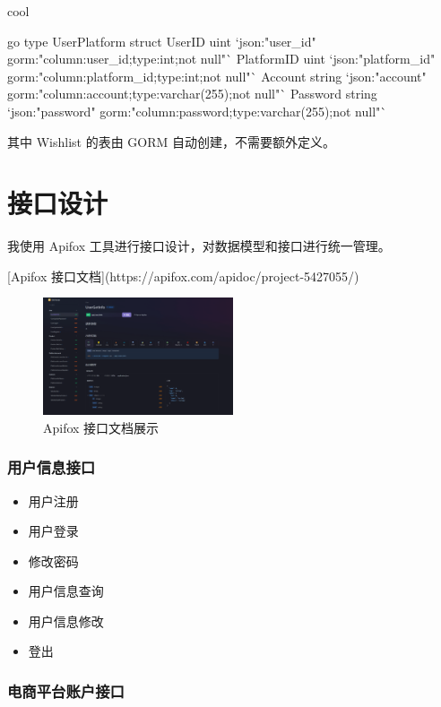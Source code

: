 \begin{codebox}{}{cool}
\begin{amzcode}{go}
type UserPlatform struct {
    UserID     uint   `json:"user_id" gorm:"column:user_id;type:int;not null"`
    PlatformID uint   `json:"platform_id" gorm:"column:platform_id;type:int;not null"`
    Account    string `json:"account" gorm:"column:account;type:varchar(255);not null"`
    Password   string `json:"password" gorm:"column:password;type:varchar(255);not null"`
}
\end{amzcode}
\end{codebox}

其中 Wishlist 的表由 GORM 自动创建，不需要额外定义。

\section{接口设计}

我使用 Apifox 工具进行接口设计，对数据模型和接口进行统一管理。

[Apifox 接口文档](https://apifox.com/apidoc/project-5427055/)

\begin{figure}[H]
\centering
\includegraphics[width=0.5\textwidth]{assets/design/apifox.png}
\caption{Apifox 接口文档展示}
\end{figure}

\subsubsection{用户信息接口}

\begin{itemize}
  \item 用户注册
  \item 用户登录
  \item 修改密码
  \item 用户信息查询
  \item 用户信息修改
  \item 登出
\end{itemize}

\subsubsection{电商平台账户接口}

